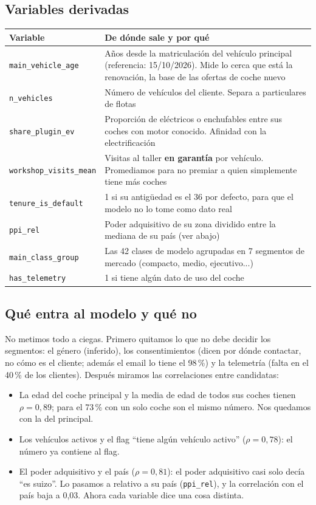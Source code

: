 \documentclass[11pt,a4paper]{article}
\newcommand{\var}[1]{\texttt{\small #1}}
\begin{document}
\subsection*{Variables derivadas}

\begin{table}[H]
\centering\small
\begin{tabularx}{\linewidth}{>{\raggedright\arraybackslash}p{4.1cm}L}
\toprule
Variable & De dónde sale y por qué \\
\midrule
\var{main\_vehicle\_age} & Años desde la matriculación del vehículo principal (referencia: 15/10/2026). Mide lo cerca que está la renovación, la base de las ofertas de coche nuevo \\
\var{n\_vehicles} & Número de vehículos del cliente. Separa a particulares de flotas \\
\var{share\_plugin\_ev} & Proporción de eléctricos o enchufables entre sus coches con motor conocido. Afinidad con la electrificación \\
\var{workshop\_visits\_mean} & Visitas al taller \textbf{en garantía} por vehículo. Promediamos para no premiar a quien simplemente tiene más coches \\
\var{tenure\_is\_default} & 1 si su antigüedad es el 36 por defecto, para que el modelo no lo tome como dato real \\
\var{ppi\_rel} & Poder adquisitivo de su zona dividido entre la mediana de su país (ver abajo) \\
\var{main\_class\_group} & Las 42 clases de modelo agrupadas en 7 segmentos de mercado (compacto, medio, ejecutivo...) \\
\var{has\_telemetry} & 1 si tiene algún dato de uso del coche \\
\bottomrule
\end{tabularx}
\end{table}

\subsection*{Qué entra al modelo y qué no}

No metimos todo a ciegas. Primero quitamos lo que no debe decidir los segmentos: el género (inferido), los consentimientos (dicen por dónde contactar, no cómo es el cliente; además el email lo tiene el 98\,\%) y la telemetría (falta en el 40\,\% de los clientes). Después miramos las correlaciones entre candidatas:

\begin{itemize}
  \item La edad del coche principal y la media de edad de todos sus coches tienen $\rho = 0{,}89$; para el 73\,\% con un solo coche son el mismo número. Nos quedamos con la del principal.
  \item Los vehículos activos y el flag ``tiene algún vehículo activo'' ($\rho = 0{,}78$): el número ya contiene al flag.
  \item El poder adquisitivo y el país ($\rho = 0{,}81$): el poder adquisitivo casi solo decía ``es suizo''. Lo pasamos a relativo a su país (\var{ppi\_rel}), y la correlación con el país baja a 0,03. Ahora cada variable dice una cosa distinta.
\end{itemize}
\end{document}
